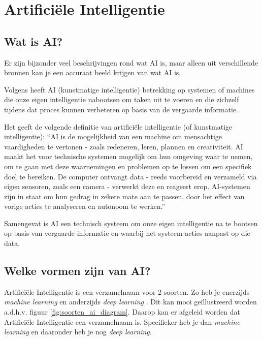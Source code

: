 \section{Artificiële Intelligentie}
\subsection{Wat is AI?}
Er zijn bijzonder veel beschrijvingen rond wat AI is, maar alleen uit verschillende bronnen kan je een accuraat beeld krijgen van wat AI is.

Volgens \textcite{Oracle2014} heeft AI (kunstmatige intelligentie) betrekking op systemen of machines die onze eigen intelligentie nabootsen om taken uit te voeren en die zichzelf tijdens dat proces kunnen verbeteren op basis van de vergaarde informatie.

Het \textcite{EuropeesParlement2020} geeft de volgende definitie van artificiële intelligentie (of kunstmatige intelligentie): ``AI is de mogelijkheid van een machine om mensachtige vaardigheden te vertonen - zoals redeneren, leren, plannen en creativiteit.
AI maakt het voor technische systemen mogelijk om hun omgeving waar te nemen, om te gaan met deze waarnemingen en problemen op te lossen om een specifiek doel te bereiken. De computer ontvangt data - reeds voorbereid en verzameld via eigen sensoren, zoals een camera - verwerkt deze en reageert erop.
AI-systemen zijn in staat om hun gedrag in zekere mate aan te passen, door het effect van vorige acties te analyseren en autonoom te werken.''

Samengevat is AI een technisch systeem om onze eigen intelligentie na te bootsen op basis van vergaarde informatie en waarbij het systeem acties aanpast op die data.

\subsection{Welke vormen zijn van AI?}
Artificiële Intelligentie is een verzamelnaam voor 2 soorten. Zo heb je enerzijds \textit{machine learning} en anderzijds \textit{deep learning} \autocite{Kavlakoglu2020}.
Dit kan mooi geïllustreerd worden a.d.h.v. figuur \ref{fig:soorten_ai_diagram}. Daarop kan er afgeleid worden dat Artificiële Intelligentie een verzamelnaam is. Specifieker heb je dan \textit{machine learning} en daaronder heb je nog \textit{deep learning}.

